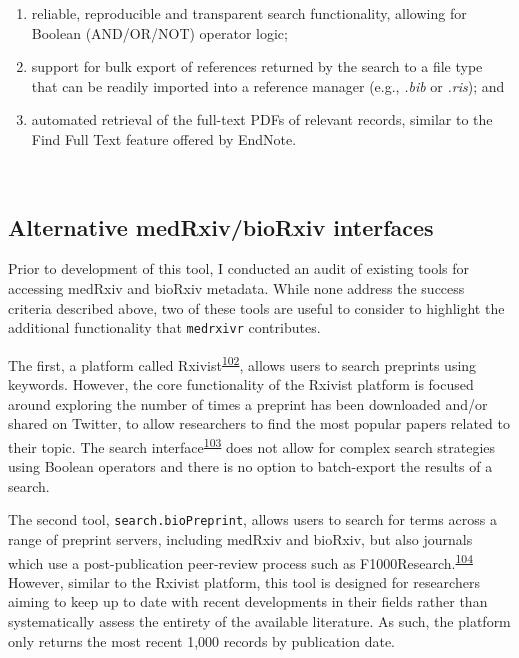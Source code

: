 \documentclass[a4paper, twoside]{templates/ociamthesis}
\begin{document}
\begin{enumerate}
\def\labelenumi{\arabic{enumi}.}
\item
  reliable, reproducible and transparent search functionality, allowing for Boolean (AND/OR/NOT) operator logic;
\item
  support for bulk export of references returned by the search to a file type that can be readily imported into a reference manager (e.g., \emph{.bib} or \emph{.ris}); and
\item
  automated retrieval of the full-text PDFs of relevant records, similar to the Find Full Text feature offered by EndNote.
\end{enumerate}

~

\hypertarget{alternative-medrxivbiorxiv-interfaces}{%
\subsection{Alternative medRxiv/bioRxiv interfaces}\label{alternative-medrxivbiorxiv-interfaces}}

Prior to development of this tool, I conducted an audit of existing tools for accessing medRxiv and bioRxiv metadata. While none address the success criteria described above, two of these tools are useful to consider to highlight the additional functionality that \texttt{medrxivr} contributes.

The first, a platform called Rxivist\textsuperscript{\protect\hyperlink{ref-abdill2019}{102}}, allows users to search preprints using keywords. However, the core functionality of the Rxivist platform is focused around exploring the number of times a preprint has been downloaded and/or shared on Twitter, to allow researchers to find the most popular papers related to their topic. The search interface\textsuperscript{\protect\hyperlink{ref-zotero-15027}{103}} does not allow for complex search strategies using Boolean operators and there is no option to batch-export the results of a search.

The second tool, \texttt{search.bioPreprint}, allows users to search for terms across a range of preprint servers, including medRxiv and bioRxiv, but also journals which use a post-publication peer-review process such as F1000Research.\textsuperscript{\protect\hyperlink{ref-iwema2016}{104}} However, similar to the Rxivist platform, this tool is designed for researchers aiming to keep up to date with recent developments in their fields rather than systematically assess the entirety of the available literature. As such, the platform only returns the most recent 1,000 records by publication date.
\end{document}
